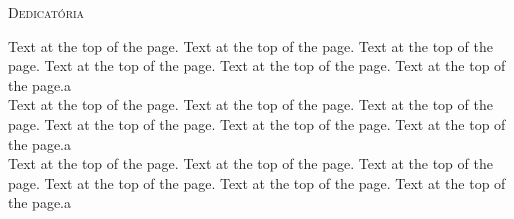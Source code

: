 \clearpage
\thispagestyle{empty}
\begin{center}
\textsc{\LARGE Dedicatória}\\[1.5cm]

\end{center}

Text at the top of the page. Text at the top of the page. 
Text at the top of the page. Text at the top of the page. 
Text at the top of the page. Text at the top of the page.a \\
Text at the top of the page. Text at the top of the page. 
Text at the top of the page. Text at the top of the page. 
Text at the top of the page. Text at the top of the page.a\\
Text at the top of the page. Text at the top of the page. 
Text at the top of the page. Text at the top of the page. 
Text at the top of the page. Text at the top of the page.a\\

\clearpage